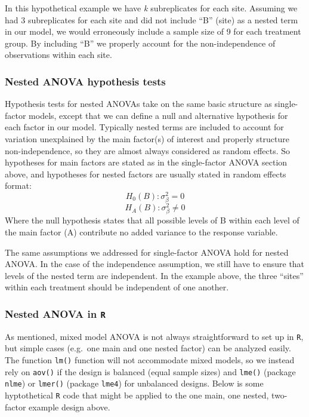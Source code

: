 \documentclass[]{book}
\begin{document}
In this hypothetical example we have \emph{k} subreplicates for each site. Assuming we had 3 subreplicates for each site and did not include ``B'' (site) as a nested term in our model, we would erroneously include a sample size of 9 for each treatment group. By including ``B'' we properly account for the non-independence of observations within each site.

\hypertarget{nested-anova-hypothesis-tests}{%
\subsubsection{Nested ANOVA hypothesis tests}\label{nested-anova-hypothesis-tests}}

Hypothesis tests for nested ANOVAs take on the same basic structure as single-factor models, except that we can define a null and alternative hypothesis for each factor in our model. Typically nested terms are included to account for variation unexplained by the main factor(s) of interest and properly structure non-independence, so they are almost always considered as random effects. So hypotheses for main factors are stated as in the single-factor ANOVA section above, and hypotheses for nested factors are usually stated in random effects format:
\[H_0(B):\sigma_{\beta}^2=0\]
\[H_A(B):\sigma_{\beta}^2\neq0\]
Where the null hypothesis states that all possible levels of B within each level of the main factor (A) contribute no added variance to the response variable.

The same assumptions we addressed for single-factor ANOVA hold for nested ANOVA. In the case of the independence assumption, we still have to ensure that levels of the nested term are independent. In the example above, the three ``sites'' within each treatment should be independent of one another.

\hypertarget{nested-anova-in-r}{%
\subsubsection{\texorpdfstring{Nested ANOVA in \texttt{R}}{Nested ANOVA in R}}\label{nested-anova-in-r}}

As mentioned, mixed model ANOVA is not always straightforward to set up in \texttt{R}, but simple cases (e.g.~one main and one nested factor) can be analyzed easily. The function \texttt{lm()} function will not accommodate mixed models, so we instead rely on \texttt{aov()} if the design is balanced (equal sample sizes) and \texttt{lme()} (package \texttt{nlme}) or \texttt{lmer()} (package \texttt{lme4}) for unbalanced designs. Below is some hyptothetical \texttt{R} code that might be applied to the one main, one nested, two-factor example design above.
\end{document}
